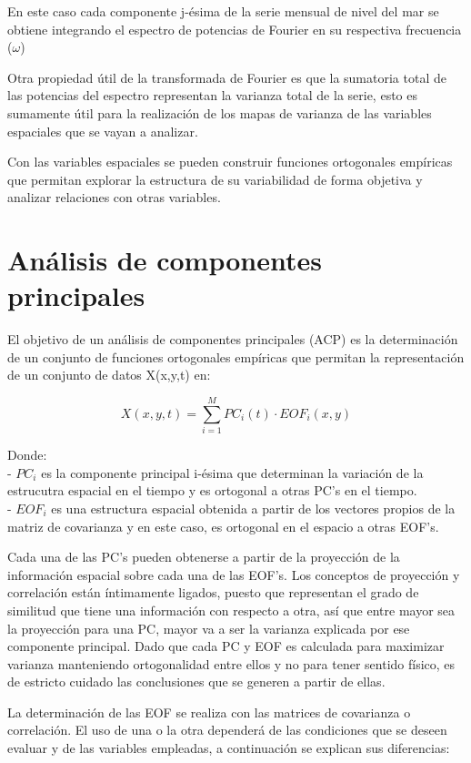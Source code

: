 En este caso cada componente j-ésima de la serie mensual de nivel del mar se obtiene integrando el espectro de potencias de Fourier en su respectiva frecuencia ($\omega$) 

Otra propiedad útil de la transformada de Fourier es que la sumatoria total de las potencias del espectro representan la varianza total de la serie, esto es sumamente útil para la realización de los mapas de varianza de las variables espaciales que se vayan a analizar.

Con las variables espaciales se pueden construir funciones ortogonales empíricas que permitan explorar la estructura de su variabilidad de forma objetiva y analizar relaciones con otras variables.

\section{Análisis de componentes principales}

El objetivo de un análisis de componentes principales (ACP) es la determinación de un conjunto de funciones ortogonales empíricas que permitan la representación de un conjunto de datos X(x,y,t) en:

\begin{equation}
X(x, y, t)=\sum_{i=1}^{M} P C_{i}(t) \cdot E O F_{i}(x, y)
\end{equation}

Donde: \\
- $PC_{i}$ es la componente principal i-ésima que determinan la variación de la estrucutra espacial en el tiempo y es ortogonal a otras PC's en el tiempo.\\
- $EOF_{i}$ es una estructura espacial obtenida a partir de los vectores propios de la matriz de covarianza y en este caso, es ortogonal en el espacio a otras EOF's.

Cada una de las PC's pueden obtenerse a partir de la proyección de la información espacial sobre cada una de las EOF's. Los conceptos de proyección y correlación están íntimamente ligados, puesto que representan el grado de similitud que tiene una información con respecto a otra, así que entre mayor sea la proyección para una PC, mayor va a ser la varianza explicada por ese componente principal. Dado que cada PC y EOF es calculada para maximizar varianza manteniendo ortogonalidad entre ellos y no para tener sentido físico, es de estricto cuidado las conclusiones que se generen a partir de ellas.

La determinación de las EOF se realiza con las matrices de covarianza o correlación. El uso de una o la otra dependerá de las condiciones que se deseen evaluar y de las variables empleadas, a continuación se explican sus diferencias:

